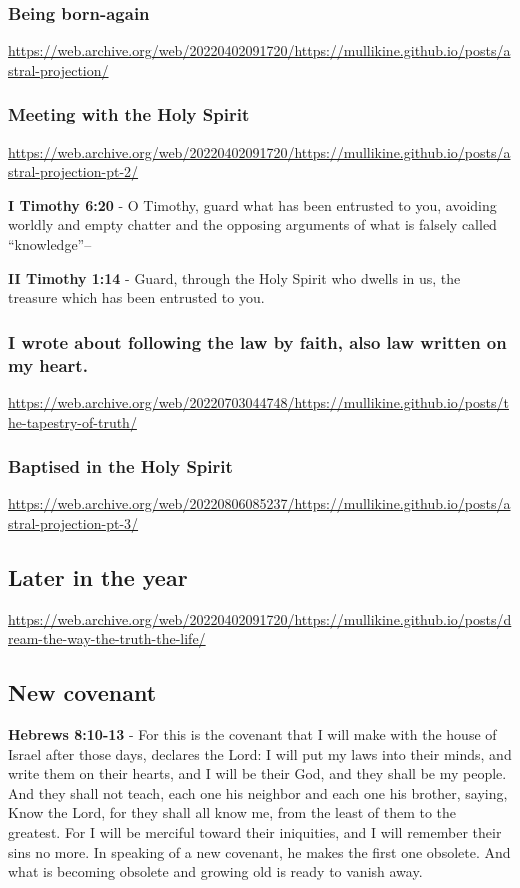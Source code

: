 \documentclass[11pt]{article}
\begin{document}
\subsubsection{Being born-again}
\label{sec:org8979daa}
\url{https://web.archive.org/web/20220402091720/https://mullikine.github.io/posts/astral-projection/}

\subsubsection{Meeting with the Holy Spirit}
\label{sec:org07e1161}
\url{https://web.archive.org/web/20220402091720/https://mullikine.github.io/posts/astral-projection-pt-2/}

\textbf{I Timothy 6:20} - O Timothy, guard what has been entrusted to you, avoiding worldly and empty chatter and the opposing arguments of what is falsely called “knowledge”--

\textbf{II Timothy 1:14} - Guard, through the Holy Spirit who dwells in us, the treasure which has been entrusted to you.

\subsubsection{I wrote about following the law by faith, also law written on my heart.}
\label{sec:org4a93e45}

\url{https://web.archive.org/web/20220703044748/https://mullikine.github.io/posts/the-tapestry-of-truth/}

\subsubsection{Baptised in the Holy Spirit}
\label{sec:org2da0b46}
\url{https://web.archive.org/web/20220806085237/https://mullikine.github.io/posts/astral-projection-pt-3/}

\subsection{Later in the year}
\label{sec:org4911262}
\url{https://web.archive.org/web/20220402091720/https://mullikine.github.io/posts/dream-the-way-the-truth-the-life/}

\subsection{New covenant}
\label{sec:org49c80bf}
\textbf{Hebrews 8:10-13} - For this is the covenant that I will make with the house of Israel after those days, declares the Lord: I will put my laws into their minds, and write them on their hearts, and I will be their God, and they shall be my people. And they shall not teach, each one his neighbor and each one his brother, saying, Know the Lord, for they shall all know me, from the least of them to the greatest. For I will be merciful toward their iniquities, and I will remember their sins no more. In speaking of a new covenant, he makes the first one obsolete. And what is becoming obsolete and growing old is ready to vanish away.
\end{document}
